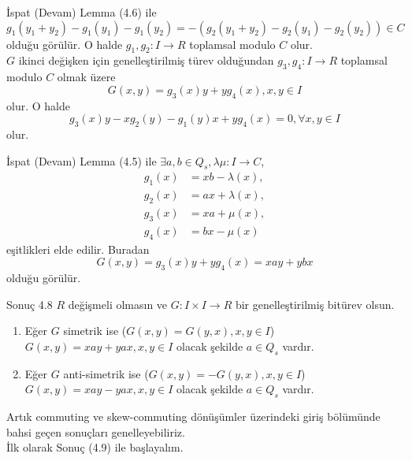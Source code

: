 \documentclass{beamer}
\begin{document}
\begin{frame}
\footnotesize

\begin{block}{İspat (Devam)}
Lemma (4.6) ile
\begin{equation*}
    g_1(y_1+y_2)-g_1(y_1)-g_1(y_2) = -(g_2(y_1+y_2)-g_2(y_1)-g_2(y_2)) \in C
\end{equation*}
olduğu görülür. O halde $g_1, g_2 \colon I \to R$ toplamsal modulo $C$ olur.\\
$G$ ikinci değişken için genelleştirilmiş türev olduğundan $g_3, g_4 \colon I \to R$ toplamsal modulo $C$ olmak üzere
\begin{equation*}
    G(x,y) = g_3(x)y+yg_4(x), x, y \in I
\end{equation*}
olur. O halde
\begin{equation*}
    g_3(x)y - xg_2(y) - g_1(y)x + yg_4(x) = 0, \forall x, y \in I
\end{equation*}
olur. 
\end{block}

\end{frame}

\begin{frame}
\footnotesize

\begin{block}{İspat (Devam)}
Lemma (4.5) ile $\exists a, b \in Q_s, \lambda \mu \colon I \to C$,
\begin{align*}
    g_1(x) &= xb- \lambda(x),\\
    g_2(x) &= ax + \lambda(x),\\
    g_3(x) &= xa + \mu(x),\\
    g_4(x) &= bx - \mu(x)
\end{align*}
eşitlikleri elde edilir. Buradan
\begin{equation*}
    G(x,y) = g_3(x)y + yg_4(x) = xay + ybx
\end{equation*}
olduğu görülür.
\end{block}
    
\end{frame}

\begin{frame}

\begin{block}{Sonuç 4.8}
$R$ değişmeli olmasın ve $G \colon I \times I \to R$ bir genelleştirilmiş bitürev olsun.
\begin{enumerate}
    \item Eğer $G$ simetrik ise ($G(x,y) = G(y,x), x, y \in I$) $G(x, y) = xay + yax, x, y \in I$ olacak şekilde $a \in Q_s$ vardır.
    \item Eğer $G$ anti-simetrik ise ($G(x,y) = -G(y,x), x, y \in I$) $G(x, y) = xay - yax, x, y \in I$ olacak şekilde $a \in Q_s$ vardır.
\end{enumerate}
\end{block}

Artık commuting ve skew-commuting dönüşümler üzerindeki giriş bölümünde bahsi geçen sonuçları genelleyebiliriz.\\
İlk olarak Sonuç (4.9) ile başlayalım.
    
\end{frame}
\end{document}
